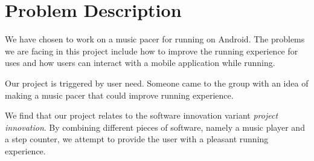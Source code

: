 \section{Problem Description}
We have chosen to work on a music pacer for running on Android. The problems we are facing in this project include how to improve the running experience for uses and how users can interact with a mobile application while running.

Our project is triggered by user need. Someone came to the group with an idea of making a music pacer that could improve running experience.


We find that our project relates to the software innovation variant \textit{project innovation}. By combining different pieces of software, namely a music player and a step counter, we attempt to provide the user with a pleasant running experience.